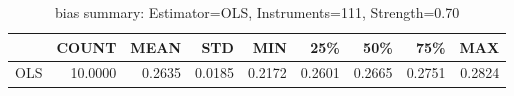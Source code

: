 \begin{table}[ht]
\centering
\caption{bias summary: Estimator=OLS, Instruments=111, Strength=0.70}
\begin{tabular}{lrrrrrrrr}
\toprule
 & COUNT & MEAN & STD & MIN & 25\% & 50\% & 75\% & MAX \\
\midrule
OLS & 10.0000 & 0.2635 & 0.0185 & 0.2172 & 0.2601 & 0.2665 & 0.2751 & 0.2824 \\
\bottomrule
\end{tabular}
\end{table}
